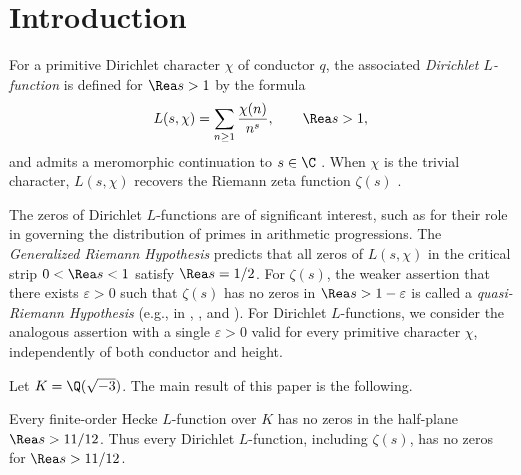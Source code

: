 \begin{abstract}
We establish the quasi-Riemann hypothesis by proving that every Dirichlet $L$-function, including Riemann's zeta function, has no zeros in the half-plane $\Rea s>11/12$. More generally, we prove the same zero-free half-plane for every finite-order Hecke $L$-function over $K=\Q(\sqrt{-3})$. In particular, this rules out the existence of Landau--Siegel zeros.
\end{abstract}

\tableofcontents

\section{Introduction}\label{sec:intro}

For a primitive Dirichlet character $\chi$ of conductor $q$, the associated \emph{Dirichlet $L$-function} is defined for $\Rea s>1$ by the formula
\[
 L(s,\chi)=\sum_{n\ge1}\frac{\chi(n)}{n^s}, \qquad \Rea s>1,
\]
and admits a meromorphic continuation to $s \in \C$ \cite[\S4.6]{IK04}. When $\chi$ is the trivial character, $L(s, \chi)$ recovers the Riemann zeta function $\zeta(s)$ \cite{Rie59}.

The zeros of Dirichlet $L$-functions are of significant interest, such as for their role in governing the distribution of primes in arithmetic progressions. The \emph{Generalized Riemann Hypothesis} predicts that all zeros of $L(s, \chi)$ in the critical strip $0 < \Rea s < 1$ satisfy $\Rea s = 1/2$.
For $\zeta(s)$, the weaker assertion that there exists
$\varepsilon>0$ such that $\zeta(s)$ has no zeros in
$\Rea s>1-\varepsilon$ is called a \emph{quasi-Riemann Hypothesis}
(e.g., in \cite[\S1]{BG17}, \cite[p.~274]{MS02}, and \cite[\S2]{BR18}).
For Dirichlet $L$-functions, we consider the analogous assertion
with a single $\varepsilon>0$ valid for every primitive character
$\chi$, independently of both conductor and height.



Let $K=\Q(\sqrt{-3})$. The main result of this paper is the following.

\begin{theorem}\label{thm:main}
Every finite-order Hecke $L$-function over $K$ has no zeros in the half-plane $\Rea s>11/12$. Thus every Dirichlet $L$-function, including $\zeta(s)$, has no zeros for $\Rea s>11/12$.
\end{theorem}
